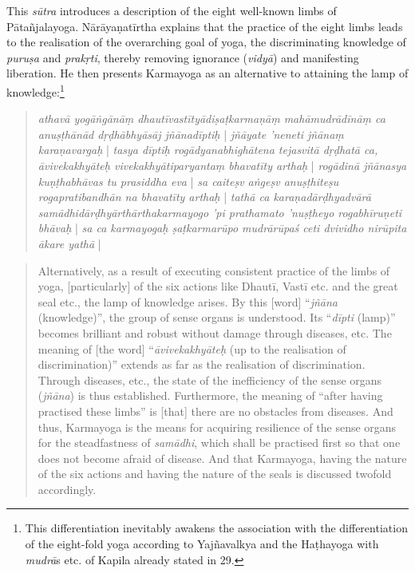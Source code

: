 This \textit{sūtra} introduces a description of the eight well-known limbs of Pātañjalayoga. Nārāyaṇatīrtha explains that the practice of the eight limbs leads to the realisation of the overarching goal of yoga, the discriminating knowledge of \textit{puruṣa} and \textit{prakṛti}, thereby removing ignorance (\textit{vidyā}) and manifesting liberation. He then presents Karmayoga as an alternative to attaining the lamp of knowledge:\footnote{This differentiation inevitably awakens the association with the differentiation of the eight-fold yoga according to Yajñavalkya and the Haṭhayoga with \textit{mudrā}s etc. of Kapila already stated in  29.}
\begin{quote}
\textit{athavā yogāṅgānāṃ dhautīvastītyādiṣaṭkarmaṇāṃ mahāmudrādīnāṃ ca anuṣṭhānād dṛḍhābhyāsāj jñānadīptiḥ} | \textit{jñāyate 'neneti jñānaṃ karaṇavargaḥ} | \textit{tasya dīptiḥ rogādyanabhighātena tejasvitā dṛḍhatā ca, āvivekakhyāteḥ vivekakhyātiparyantaṃ bhavatīty arthaḥ} | \textit{rogādinā jñānasya kuṇṭhabhāvas tu prasiddha eva} | \textit{sa caiteṣv aṅgeṣv anuṣṭhiteṣu rogapratibandhān na bhavatīty arthaḥ} | \textit{tathā ca karaṇadārḍhyadvārā samādhidārḍhyārthārthakarmayogo 'pi prathamato 'nuṣṭheyo rogabhīruṇeti bhāvaḥ} | \textit{sa ca karmayogaḥ ṣaṭkarmarūpo mudrārūpaś ceti dvividho nirūpita ākare yathā} | 
\end{quote}
\begin{quote}
Alternatively, as a result of executing consistent practice of the limbs of yoga, [particularly] of the six actions like Dhautī, Vastī etc. and the great seal etc., the lamp of knowledge arises. By this [word] ``\textit{jñāna} (knowledge)'', the group of sense organs is understood. Its ``\textit{dīpti} (lamp)'' becomes brilliant and robust without damage through diseases, etc. The meaning of [the word] ``\textit{āvivekakhyāteḥ} (up to the realisation of discrimination)'' extends as far as the realisation of discrimination. Through diseases, etc., the state of the inefficiency of the sense organs (\textit{jñāna}) is thus established. Furthermore, the meaning of ``after having practised these limbs'' is [that] there are no obstacles from diseases. And thus, Karmayoga is the means for acquiring resilience of the sense organs for the steadfastness of \textit{samādhi}, which shall be practised first so that one does not become afraid of disease. And that Karmayoga, having the nature of the six actions and having the nature of the seals is discussed twofold accordingly.
\end{quote}

